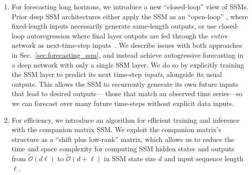 \begin{enumerate}[topsep=0pt,leftmargin=*]
    \item 
    For forecasting long horizons, we introduce a new ``closed-loop'' view of SSMs. Prior deep SSM architectures either apply the SSM as an ``open-loop'' \citep{gu2021efficiently}, where fixed-length inputs necessarily generate same-length outputs, or use closed-loop autoregression where final layer outputs are fed through the \emph{entire} network as next-time-step inputs~\citep{goel2022s}. 
    We describe issues with both approaches in Sec.~\ref{sec:forecasting_ssm}, and instead achieve autogressive forecasting in a deep network with only a single SSM layer. We do so by explicitly training the SSM layer to predict its next time-step \emph{inputs}, alongside its usual outputs. This allows the SSM to recurrently generate its own future inputs that lead to desired outputs---\ie{} those that match an observed time series---so we can forecast over many future time-steps without explicit data inputs. 

    \item For efficiency, we introduce an algorithm for efficient training and inference with the companion matrix SSM. We 
    exploit the companion matrix's structure as a ``shift plus low-rank'' matrix, which allows us to reduce the time and space complexity for computing SSM hidden states and outputs from $\tilde{\mathcal{O}}(d \ell )$ to $\tilde{\mathcal{O}}(d + \ell)$ in SSM state size $d$ and input sequence length $\ell$. 
\end{enumerate}

